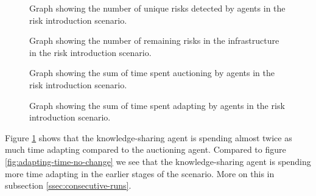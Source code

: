 \begin{figure}[H]
    \centering
        
    \caption{Graph showing the number of unique risks detected by agents in the risk introduction scenario.}
\end{figure}
\begin{figure}[H]
    \centering
        
    \caption{Graph showing the number of remaining risks in the infrastructure in the risk introduction scenario.}
\end{figure}
\begin{figure}[H]
    \centering
        
    \caption{Graph showing the sum of time spent auctioning by agents in the risk introduction scenario.}
\end{figure}
\begin{figure}[H]
    \centering
        
    \caption{Graph showing the sum of time spent adapting by agents in the risk introduction scenario.}
    \label{fig:adapting-time-risk-introduction}
\end{figure}

Figure \ref{fig:adapting-time-risk-introduction} shows that the knowledge-sharing agent is spending almost twice as much time adapting compared to the auctioning agent. Compared to figure \ref{fig:adapting-time-no-change} we see that the knowledge-sharing agent is spending more time adapting in the earlier stages of the scenario. More on this in subsection \ref{ssec:consecutive-runs}.
